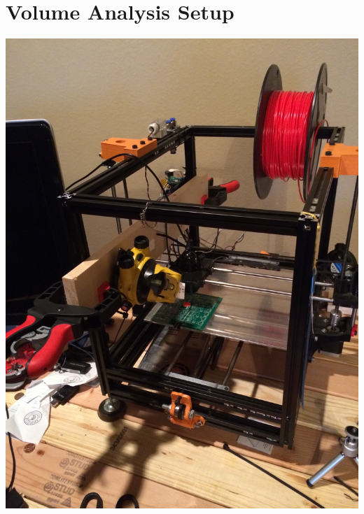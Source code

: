 \documentclass[12pt]{article}
\begin{document}
\maketitle

\section{Volume Analysis Setup}
\includegraphics[scale=0.1,angle=270]{images/volume_analysis_setup/IMG_0604.JPG}
\end{document}
